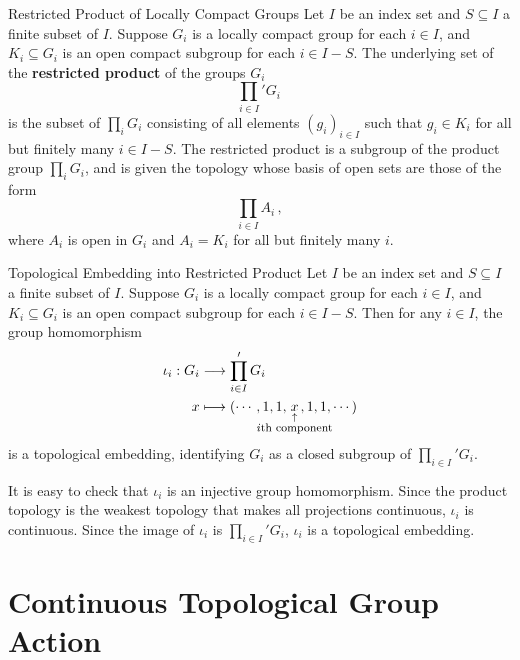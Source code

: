 \documentclass{report}
\begin{document}
\begin{definition}{Restricted Product of Locally Compact Groups}{}
Let \( I \) be an index set and \( S\subseteq I \) a finite subset of \( I \). Suppose \( G_i \) is a locally compact group for each \( i \in I \), and \( K_i \subseteq G_i \) is an open compact subgroup for each \( i \in I - S \). The underlying set of the \textbf{restricted product} of the groups \( G_i \)  
\[
\prod_{i\in I}' G_i\,
\]
is the subset of $\prod_i G_i$ consisting of all elements \( (g_i)_{i \in I} \) such that \( g_i \in K_i \) for all but finitely many \( i \in I - S \). The restricted product is a subgroup of the product group $\prod_i G_i$, and is given the topology whose basis of open sets are those of the form
\[
\prod_{i\in I} A_i\,,
\]
where \( A_i \) is open in \( G_i \) and \( A_i = K_i \) for all but finitely many \( i \).
\end{definition}

\begin{example}{Topological Embedding into Restricted Product}{}
	Let \( I \) be an index set and \( S\subseteq I \) a finite subset of \( I \). Suppose \( G_i \) is a locally compact group for each \( i \in I \), and \( K_i \subseteq G_i \) is an open compact subgroup for each \( i \in I - S \). Then for any $i\in I$, the group homomorphism
	\begin{align*}
		\iota_i:G_i &\longrightarrow \prod_{i\in I}' G_i \\
		x &\longmapsto (\cdots, 1, 1, \underset{\hspace{-2.3em} \substack{\uparrow \\ \text{\footnotesize $i$th component}}\hspace{-2.3em}}{x},
		1, 1,  \cdots)
	\end{align*}
	is a topological embedding, identifying $G_i$ as a closed subgroup of $\prod_{i\in I}' G_i$.
\end{example}
\begin{prf}
	It is easy to check that $\iota_i$ is an injective group homomorphism. Since the product topology is the weakest topology that makes all projections continuous, $\iota_i$ is continuous. Since the image of $\iota_i$ is $\prod_{i\in I}' G_i$, $\iota_i$ is a topological embedding.
\end{prf}



\section{Continuous Topological Group Action}
\end{document}
